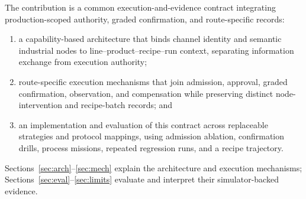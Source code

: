 The contribution is a common execution-and-evidence contract integrating
production-scoped authority, graded confirmation, and route-specific records:
\begin{enumerate}
\item a capability-based architecture that binds channel identity and
semantic industrial nodes to line--product--recipe--run context, separating
information exchange from execution authority;
\item route-specific execution mechanisms that join admission, approval,
graded confirmation, observation, and compensation while preserving
distinct node-intervention and recipe-batch records; and
\item an implementation and evaluation of this contract across replaceable
strategies and protocol mappings, using admission ablation, confirmation
drills, process missions, repeated regression runs, and a recipe trajectory.
\end{enumerate}

Sections~\ref{sec:arch}--\ref{sec:mech} explain the architecture and execution
mechanisms; Sections~\ref{sec:eval}--\ref{sec:limits} evaluate and interpret
their simulator-backed evidence.
